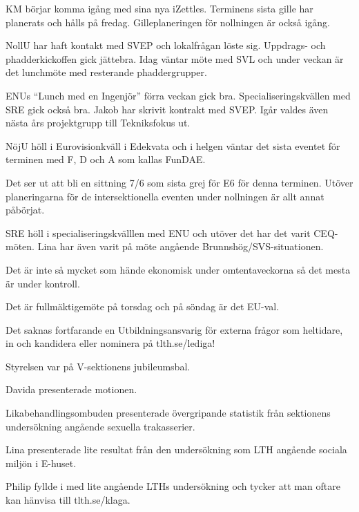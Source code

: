 \documentclass[10pt]{article}
\begin{document}
\begin{paragrafer}
\begin{paragrafer}
KM börjar komma igång med sina nya iZettles. Terminens sista gille har planerats och hålls på fredag. Gilleplaneringen för nollningen är också igång.

NollU har haft kontakt med SVEP och lokalfrågan löste sig. Uppdrags- och phadderkickoffen gick jättebra. Idag väntar möte med SVL och under veckan är det lunchmöte med resterande phaddergrupper. 

ENUs ``Lunch med en Ingenjör'' förra veckan gick bra. Specialiseringskvällen med SRE gick också bra. Jakob har skrivit kontrakt med SVEP. Igår valdes även nästa års projektgrupp till Tekniksfokus ut.

NöjU höll i Eurovisionkväll i Edekvata och i helgen väntar det sista eventet för terminen med F, D och A som kallas FunDAE.

Det ser ut att bli en sittning 7/6 som sista grej för E6 för denna terminen. Utöver planeringarna för de intersektionella eventen under nollningen är allt annat påbörjat.

SRE höll i specialiseringskvälllen med ENU och utöver det har det varit CEQ-möten. Lina har även varit på möte angående Brunnshög/SVS-situationen. 

Det är inte så mycket som hände ekonomisk under omtentaveckorna så det mesta är under kontroll.

Det är fullmäktigemöte på torsdag och på söndag är det EU-val.  

Det saknas fortfarande en Utbildningsansvarig för externa frågor som heltidare, in och kandidera eller nominera på tlth.se/lediga!

Styrelsen var på V-sektionens jubileumsbal. 

\end{paragrafer}

Davida presenterade motionen.

\Mbaby 

Likabehandlingsombuden presenterade övergripande statistik från sektionens undersökning angående sexuella trakasserier.

Lina presenterade lite resultat från den undersökning som LTH angående sociala miljön i E-huset.

Philip fyllde i med lite angående LTHs undersökning och tycker att man oftare kan hänvisa till tlth.se/klaga.


\end{paragrafer}
\end{document}
